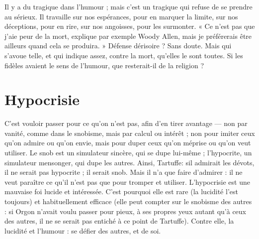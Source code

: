 Il y a du tragique dans l’humour ; mais c’est un tragique qui refuse de se
prendre au sérieux. Il travaille sur nos espérances, pour en marquer la limite,
sur nos déceptions, pour en rire, sur nos angoisses, pour les surmonter. « Ce
n’est pas que j'aie peur de la mort, explique par exemple Woody Allen, mais je
préférerais être ailleurs quand cela se produira. » Défense dérisoire ? Sans doute.
Mais qui s’avoue telle, et qui indique assez, contre la mort, qu’elles le sont
toutes. Si les fidèles avaient le sens de l'humour, que resterait-il de la religion ?

\section{Hypocrisie}
C’est vouloir passer pour ce qu’on n’est pas, afin d’en tirer
avantage — non par vanité, comme dans le snobisme, mais
par calcul ou intérêt ; non pour imiter ceux qu’on admire ou qu’on envie, mais
pour duper ceux qu’on méprise ou qu’on veut utiliser. Le snob est un simulateur
sincère, qui se dupe lui-même ; l’hypocrite, un simulateur mensonger, qui
dupe les autres. Ainsi, Tartuffe: sil admirait les dévots, il ne serait pas
hypocrite ; il serait snob. Mais il n’a que faire d’admirer : il ne veut paraître ce
qu’il n’est pas que pour tromper et utiliser. L’hypocrisie est une mauvaise foi
lucide et intéressée. C’est pourquoi elle est rare (la lucidité l’est toujours) et
habituellement efficace (elle peut compter sur le snobisme des autres : si Orgon
n'avait voulu passer pour pieux, à ses propres yeux autant qu’à ceux des autres,
il ne se serait pas entiché à ce point de Tartuffe). Contre elle, la lucidité et
l'humour : se défier des autres, et de soi.

